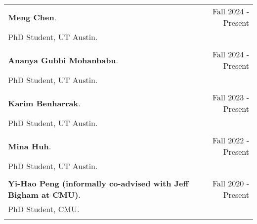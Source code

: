 \begin{longtable}{Xr}
	\textbf{Meng Chen}. & Fall 2024 - Present \\
	PhD Student, UT Austin. &  \\
	\\

	\textbf{Ananya Gubbi Mohanbabu}. & Fall 2024 - Present \\
	PhD Student, UT Austin. &  \\
	\\

	\textbf{Karim Benharrak}. & Fall 2023 - Present \\
	PhD Student, UT Austin. &  \\
	\\

	\textbf{Mina Huh}. & Fall 2022 - Present \\
	PhD Student, UT Austin. &  \\
	\\

	\textbf{Yi-Hao Peng (informally co-advised with Jeff Bigham at CMU)}. & Fall 2020 - Present \\
	PhD Student, CMU. &  \\
	\\

\end{longtable}